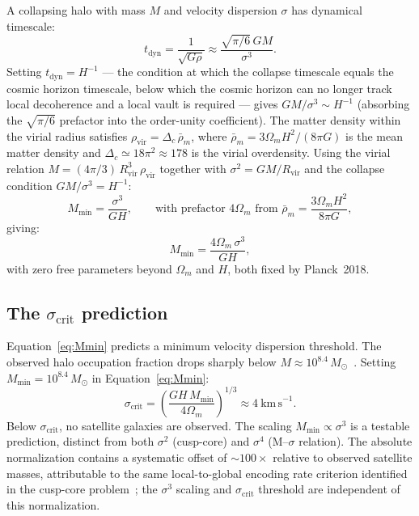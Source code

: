 \documentclass[12pt,a4paper]{article}
\begin{document}
A collapsing halo with mass $M$ and velocity dispersion $\sigma$ has
dynamical timescale:
\begin{equation}
t_\mathrm{dyn} = \frac{1}{\sqrt{G\rho}} \approx \frac{\sqrt{\pi/6}\,GM}{\sigma^3}.
\end{equation}
Setting $t_\mathrm{dyn} = H^{-1}$ --- the condition at which the collapse
timescale equals the cosmic horizon timescale, below which the cosmic
horizon can no longer track local decoherence and a local vault is required
--- gives $GM/\sigma^3 \sim H^{-1}$ (absorbing the $\sqrt{\pi/6}$
prefactor into the order-unity coefficient). The matter density within the
virial radius satisfies $\rho_\mathrm{vir} = \Delta_c\,\bar{\rho}_m$,
where $\bar{\rho}_m = 3\Omega_m H^2/(8\pi G)$ is the mean matter density
and $\Delta_c \simeq 18\pi^2 \approx 178$ is the virial overdensity.
Using the virial relation $M = (4\pi/3)\,R_\mathrm{vir}^3\,\rho_\mathrm{vir}$
together with $\sigma^2 = GM/R_\mathrm{vir}$ and the collapse condition
$GM/\sigma^3 = H^{-1}$:
\begin{equation}
M_\mathrm{min} = \frac{\sigma^3}{GH}, \qquad
\text{with prefactor } 4\Omega_m \text{ from } \bar{\rho}_m = \frac{3\Omega_m H^2}{8\pi G},
\end{equation}
giving:
\begin{equation}
\boxed{M_\mathrm{min} = \frac{4\Omega_m\,\sigma^3}{G H}},
\label{eq:Mmin}
\end{equation}
with zero free parameters beyond $\Omega_m$ and $H$, both fixed by
Planck~2018.

\subsection{The $\sigma_\mathrm{crit}$ prediction}

Equation~\ref{eq:Mmin} predicts a minimum velocity dispersion threshold.
The observed halo occupation fraction drops sharply below
$M \approx 10^{8.4}\,M_\odot$~\citep{Kim2021}. Setting
$M_\mathrm{min} = 10^{8.4}\,M_\odot$ in Equation~\ref{eq:Mmin}:
\begin{equation}
\sigma_\mathrm{crit} = \left(\frac{G H\, M_\mathrm{min}}{4\Omega_m}
\right)^{1/3} \approx 4\ \mathrm{km\,s}^{-1}.
\label{eq:sigma_crit}
\end{equation}
Below $\sigma_\mathrm{crit}$, no satellite galaxies are observed. The
scaling $M_\mathrm{min} \propto \sigma^3$ is a testable prediction,
distinct from both $\sigma^2$ (cusp-core) and $\sigma^4$ (M--$\sigma$
relation). The absolute normalization contains a systematic offset of
$\sim 100\times$ relative to observed satellite masses, attributable to
the same local-to-global encoding rate criterion identified in the
cusp-core problem~\citep{IAM_small_scale}; the $\sigma^3$ scaling and
$\sigma_\mathrm{crit}$ threshold are independent of this normalization.
\end{document}
